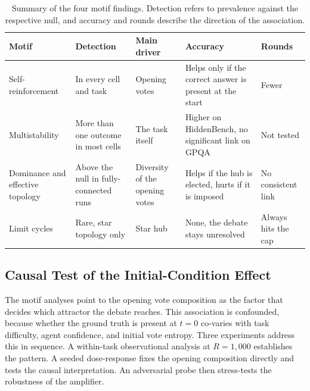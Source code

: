 \begin{table}[H]
\centering
\small
\begin{tabularx}{\textwidth}{
  >{\raggedright\arraybackslash}p{2.6cm}
  >{\raggedright\arraybackslash}X
  >{\raggedright\arraybackslash}X
  >{\raggedright\arraybackslash}X
  >{\raggedright\arraybackslash}p{2.2cm}}
\toprule
Motif & Detection & Main driver & Accuracy & Rounds \\
\midrule
Self-reinforcement
  & In every cell and task
  & Opening votes
  & Helps only if the correct answer is present at the start
  & Fewer \\
\addlinespace
Multistability
  & More than one outcome in most cells
  & The task itself
  & Higher on HiddenBench, no significant link on GPQA
  & Not tested \\
\addlinespace
Dominance and effective topology
  & Above the null in fully-connected runs
  & Diversity of the opening votes
  & Helps if the hub is elected, hurts if it is imposed
  & No consistent link \\
\addlinespace
Limit cycles
  & Rare, star topology only
  & Star hub
  & None, the debate stays unresolved
  & Always hits the cap \\
\bottomrule
\end{tabularx}
\caption[Summary of self-organization motif findings]{Summary of the four motif
         findings. Detection refers to prevalence against the respective null,
         and accuracy and rounds describe the direction of the association.}
\label{tab:motif:summary}
\end{table}

\subsection{Causal Test of the Initial-Condition Effect}
\label{sec:results:evid}

The motif analyses point to the opening vote composition as the factor that decides
which attractor the debate reaches. This association is confounded, because whether
the ground truth is present at $t=0$ co-varies with task difficulty, agent confidence,
and initial vote entropy. Three experiments address this in sequence. A within-task
observational analysis at $R=1{,}000$ establishes the pattern. A seeded dose-response
fixes the opening composition directly and tests the causal interpretation. An
adversarial probe then stress-tests the robustness of the amplifier.

